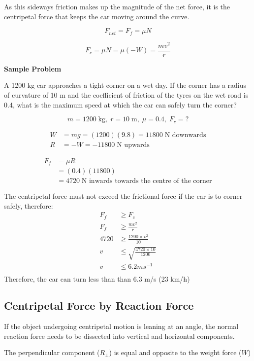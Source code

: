 		As this sideways friction makes up the magnitude of the net force, it is the centripetal force that keeps the car moving around the curve.

		$$F_{net} = F_f = \mu N$$

		$$F_c = \mu N = \mu (-W) = \frac{mv^2}{r}$$

		\textbf{Sample Problem}

		A 1200 kg car approaches a tight corner on a wet day. If the corner has a radius of curvature of 10 m and the coefficient of friction of the tyres on the wet road is 0.4, what is the maximum speed at which the car can safely turn the corner?

		$$m = 1200\;\text{kg},\; r = 10\;\text{m},\;\mu = 0.4,\; F_{c} = ?$$

		\begin{align*}
			W &= mg = (1200)(9.8) = 11800\;\text{N downwards} \\
			R &= -W = -11800\;\text{N upwards}
		\end{align*}

		\begin{align*}
			F_{f} &= \mu R \\
			&= (0.4)(11800) \\
			&= 4720\;\text{N inwards towards the centre of the corner}
		\end{align*}

		The centripetal force must not exceed the frictional force if the car is to corner safely, therefore:
		\begin{align*}
			F_f &\ge F_c \\
			F_f &\ge \frac{mv^2}{r} \\
			4720 &\ge \frac{1200 \times v^2}{10} \\
			v &\le \sqrt{\frac{4720 \times 10}{1200}} \\
			v &\le 6.2ms^{-1} \\
		\end{align*}
		Therefore, the car can turn less than than 6.3 m/s (23 km/h)

	\subsection{Centripetal Force by Reaction Force}
		If the object undergoing centripetal motion is leaning at an angle, the normal reaction force needs to be dissected into vertical and horizontal components.

		The perpendicular component ($R_{\perp}$) is equal and opposite to the weight force ($W$)

